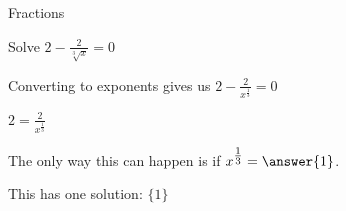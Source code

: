 \documentclass{ximera}
\begin{document}
\begin{example}  Fractions


Solve $2 - \frac{2}{\sqrt[3]{x}} = 0$



\begin{explanation}


Converting to exponents gives us $2 - \frac{2}{x^{\tfrac{1}{3}}} = 0$


$2 = \frac{2}{x^{\tfrac{1}{3}}}$

The only way this can happen is if $x^{\tfrac{1}{3}} = \answer{1}$.

This has one solution: $\{  1  \}$





\end{explanation}


\end{example}
\end{document}
